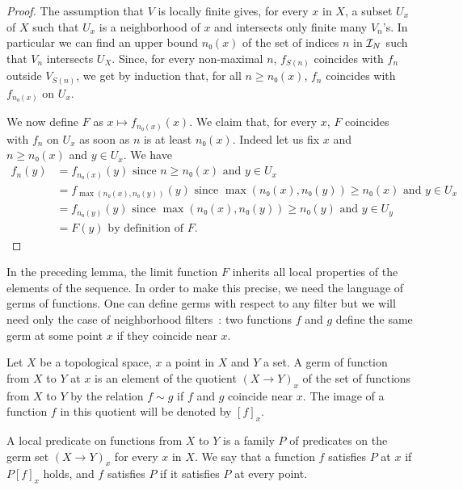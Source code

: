 \begin{proof}\leanok
  The assumption that $V$ is locally finite gives, for every $x$ in $X$, a
  subset $U_x$ of $X$ such that $U_x$ is a neighborhood of $x$ and intersects
  only finite many $V_n$'s. In particular we can find an upper bound $n₀(x)$ of the set
  of indices $n$ in $\mathcal{I}_{N}$ such that $V_n$ intersects $U_X$.
  Since, for every non-maximal $n$, $f_{S(n)}$ coincides with $f_n$ outside
  $V_{S(n)}$, we get by induction that, for all $n ≥ n₀(x)$, $f_n$ coincides
  with $f_{n₀(x)}$ on $U_x$.

  We now define $F$ as $x ↦ f_{n₀(x)}(x)$. We claim that, for every $x$,
  $F$ coincides with $f_n$ on $U_x$ as soon as $n$ is at least $n₀(x)$.
  Indeed let us fix $x$ and $n ≥ n₀(x)$ and $y ∈ U_x$. We have
  \begin{align*}
    f_n(y) &= f_{n₀(x)}(y) \text{ since $n ≥ n₀(x)$ and $y ∈ U_x$}\\
           &= f_{\max(n₀(x), n₀(y))}(y) \text{ since $\max(n₀(x), n₀(y)) ≥ n₀(x)$ and $y ∈ U_x$}\\
           &= f_{n₀(y)}(y) \text{ since $\max(n₀(x), n₀(y)) ≥ n₀(y)$ and $y ∈ U_y$}\\
           &= F(y) \text{ by definition of $F$}.
  \end{align*}
\end{proof}

In the preceding lemma, the limit function $F$ inherits all local properties of
the elements of the sequence. In order to make this precise, we need the
language of germs of functions. One can define germs with respect to any filter but
we will need only the case of neighborhood filters~: two functions $f$ and $g$
define the same germ at some point $x$ if they coincide near $x$.

\begin{definition}\label{def:germ}\leanok
  Let $X$ be a topological space, $x$ a point in $X$ and $Y$ a set. A germ of function
  from $X$ to $Y$ at $x$ is an element of the quotient $(X → Y)_x$ of the set of functions
  from $X$ to $Y$ by the relation $f ∼ g$ if $f$ and $g$ coincide near $x$. The image
  of a function $f$ in this quotient will be denoted by $[f]_x$.

  A local predicate on functions from $X$ to $Y$ is a family $P$ of predicates on the
  germ set $(X → Y)_x$ for every $x$ in $X$. We say that a function $f$
  satisfies $P$ at $x$ if $P [f]_x$ holds, and $f$ satisfies $P$ if it
  satisfies $P$ at every point.
\end{definition}

